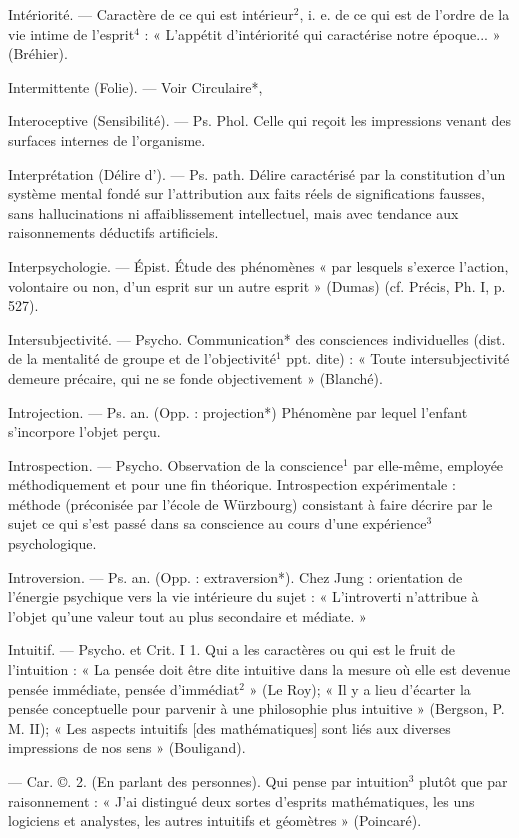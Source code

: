 Intériorité. — Caractère de ce qui est
intérieur$^2$, i. e. de ce qui est de
l’ordre de la vie intime de l'esprit$^4$ :
« L'appétit d'intériorité qui caractérise notre époque... » (Bréhier).

Intermittente (Folie). — Voir Circulaire*,

Interoceptive (Sensibilité). — Ps. Phol.
Celle qui reçoit les impressions
venant des surfaces internes de
l'organisme.

Interprétation (Délire d’). — Ps. path.
Délire caractérisé par la constitution d’un système mental fondé sur
l'attribution aux faits réels de significations fausses, sans hallucinations ni affaiblissement intellectuel,
mais avec tendance aux raisonnements déductifs artificiels.

Interpsychologie. — Épist. Étude des
phénomènes « par lesquels s'exerce
l'action, volontaire ou non, d’un
esprit sur un autre esprit » (Dumas)
(cf. Précis, Ph. I, p. 527).

Intersubjectivité. — Psycho. Communication* des consciences individuelles (dist. de la mentalité de
groupe et de l’objectivité$^1$ ppt. dite) :
« Toute intersubjectivité demeure
précaire, qui ne se fonde objectivement » (Blanché).

Introjection. — Ps. an. (Opp. : projection*) Phénomène par lequel l’enfant
s’incorpore l'objet perçu.

Introspection. — Psycho. Observation
de la conscience$^1$ par elle-même,
employée méthodiquement et pour
une fin théorique. Introspection
expérimentale : méthode (préconisée
par l’école de Würzbourg) consistant à faire décrire par le sujet ce
qui s’est passé dans sa conscience
au cours d'une expérience$^3$ psychologique.

Introversion. — Ps. an. (Opp. : extraversion*). Chez Jung : orientation
de l'énergie psychique vers la vie
intérieure du sujet : « L’introverti
n’attribue à l’objet qu'une valeur
tout au plus secondaire et médiate. »

Intuitif. — Psycho. et Crit. I 1. Qui a
les caractères ou qui est le fruit de
l'intuition : « La pensée doit être
dite intuitive dans la mesure où
elle est devenue pensée immédiate,
pensée d'immédiat$^2$ » (Le Roy); « Il
y a lieu d’écarter la pensée conceptuelle pour parvenir à une philosophie plus intuitive » (Bergson,
P. M. II); « Les aspects intuitifs
[des mathématiques] sont liés aux
diverses impressions de nos sens »
(Bouligand).

— Car. ©. 2. (En parlant des
personnes). Qui pense par intuition$^3$ plutôt que par raisonnement :
« J'ai distingué deux sortes d’esprits
mathématiques, les uns logiciens et
analystes, les autres intuitifs et
géomètres » (Poincaré).

